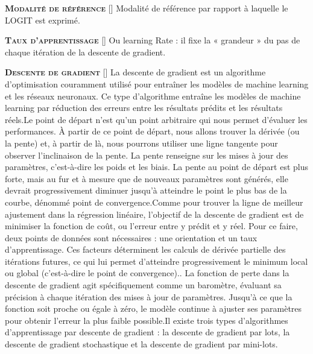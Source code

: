 \documentclass[10pt,french]{report}
\newcommand{\cube}{\raisebox{0.13ex}{\scalebox{0.75}{ $\blacksquare$ }}}
\newcommand{\entreelex}[3][]{%
	{\large \textbf{\textsc{#2}}} %
	\if\relax\detokenize{#1}\relax %
	\else %
	\raisebox{0.15ex}{\scalebox{0.7}{$\Diamond$}} %
	[#1] %
	\fi
	\raisebox{0.13ex}{\scalebox{0.75}{$\blacksquare$}} #3 %
}
\begin{document}
	\entreelex{Modalité de référence}{Modalité de référence par rapport à laquelle le LOGIT est exprimé.}
	
	\label{taux apprentissag}
	\entreelex{Taux d'apprentissage}{Ou learning Rate : il fixe la « grandeur » du pas de chaque itération de la descente de gradient.}

	\entreelex{Descente de gradient}{La descente de gradient est un algorithme d’optimisation couramment utilisé pour entraîner les modèles de machine learning et les réseaux neuronaux. Ce type d’algorithme entraîne les modèles de machine learning par réduction des erreurs entre les résultats prédits et les résultats réels.\cube Le point de départ n'est qu'un point arbitraire qui nous permet d'évaluer les performances. À partir de ce point de départ, nous allons trouver la dérivée (ou la pente) et, à partir de là, nous pourrons utiliser une ligne tangente pour observer l'inclinaison de la pente. La pente renseigne sur les mises à jour des paramètres, c'est-à-dire les poids et les biais. La pente au point de départ est plus forte, mais au fur et à mesure que de nouveaux paramètres sont générés, elle devrait progressivement diminuer jusqu'à atteindre le point le plus bas de la courbe, dénommé point de convergence.\cube Comme pour trouver la ligne de meilleur ajustement dans la régression linéaire, l'objectif de la descente de gradient est de minimiser la fonction de coût, ou l'erreur entre y prédit et y réel. Pour ce faire, deux points de données sont nécessaires : une orientation et un taux d'apprentissage. Ces facteurs déterminent les calculs de dérivée partielle des itérations futures, ce qui lui permet d'atteindre progressivement le minimum local ou global (c'est-à-dire le point de convergence).. La fonction de perte dans la descente de gradient agit spécifiquement comme un baromètre, évaluant sa précision à chaque itération des mises à jour de paramètres. Jusqu'à ce que la fonction soit proche ou égale à zéro, le modèle continue à ajuster ses paramètres pour obtenir l'erreur la plus faible possible.\cube Il existe trois types d'algorithmes d'apprentissage par descente de gradient : la descente de gradient par lots, la descente de gradient stochastique et la descente de gradient par mini-lots.}
	
	\listoffigures
\end{document}
